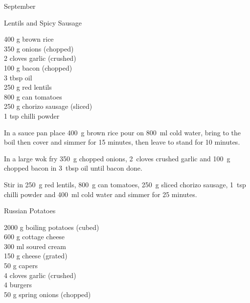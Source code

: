 \begin{menu}{September}
    \begin{recipe}{2}{Lentils and Spicy Sausage}%
		\begin{ingredients}
		400 g brown rice  \\
	350 g onions (chopped) \\
	2 cloves garlic (crushed) \\
	100 g bacon (chopped) \\
	3 tbsp oil  \\
	250 g red lentils  \\
	800 g can tomatoes  \\
	250 g chorizo sausage (sliced) \\
	1 tsp chilli powder  \\
	
		\end{ingredients}
	
    \begin{instructions}
    \item 
      In a
      sauce pan
      place
      400~g  brown rice
      pour on
      800~ml  cold water,
      bring to the boil then cover and simmer for 15 minutes,
      then leave to stand for 10 minutes.
    \item 
        In a large wok fry
        350~g chopped onions,
        2~cloves crushed garlic
        and
        100~g chopped bacon
        in
        3~tbsp  oil
        until bacon done.
      \item 
        Stir in
        250~g  red lentils,
        800~g  can tomatoes,
        250~g sliced chorizo sausage,
        1~tsp  chilli powder
        and
        400~ml  cold water
        and simmer for 25 minutes.
      
    \end{instructions}
    \end{recipe}%
  
    \begin{recipe}{2}{Russian Potatoes}%
		\begin{ingredients}
		2000 g boiling potatoes (cubed) \\
	600 g cottage cheese  \\
	300 ml soured cream  \\
	150 g cheese (grated) \\
	50 g capers  \\
	4 cloves garlic (crushed) \\
	4  burgers  \\
	50 g spring onions (chopped) \\
	

\end{ingredients}
\end{recipe}
\end{menu}

